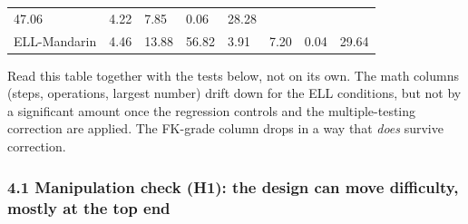 \documentclass[
]{article}
\begin{document}
\begin{longtable}[]{@{}llllllll@{}}
\begin{minipage}[t]{0.10\columnwidth}
47.06\strut
\end{minipage} & \begin{minipage}[t]{0.10\columnwidth}\raggedright
4.22\strut
\end{minipage} & \begin{minipage}[t]{0.10\columnwidth}\raggedright
7.85\strut
\end{minipage} & \begin{minipage}[t]{0.10\columnwidth}\raggedright
0.06\strut
\end{minipage} & \begin{minipage}[t]{0.10\columnwidth}\raggedright
28.28\strut
\end{minipage}\tabularnewline
\begin{minipage}[t]{0.10\columnwidth}\raggedright
ELL-Mandarin\strut
\end{minipage} & \begin{minipage}[t]{0.10\columnwidth}\raggedright
4.46\strut
\end{minipage} & \begin{minipage}[t]{0.10\columnwidth}\raggedright
13.88\strut
\end{minipage} & \begin{minipage}[t]{0.10\columnwidth}\raggedright
56.82\strut
\end{minipage} & \begin{minipage}[t]{0.10\columnwidth}\raggedright
3.91\strut
\end{minipage} & \begin{minipage}[t]{0.10\columnwidth}\raggedright
7.20\strut
\end{minipage} & \begin{minipage}[t]{0.10\columnwidth}\raggedright
0.04\strut
\end{minipage} & \begin{minipage}[t]{0.10\columnwidth}\raggedright
29.64\strut
\end{minipage}\tabularnewline
\bottomrule
\end{longtable}

Read this table together with the tests below, not on its own. The math
columns (steps, operations, largest number) drift down for the ELL
conditions, but not by a significant amount once the regression controls
and the multiple-testing correction are applied. The FK-grade column
drops in a way that \emph{does} survive correction.

\hypertarget{manipulation-check-h1-the-design-can-move-difficulty-mostly-at-the-top-end}{%
\subsubsection{4.1 Manipulation check (H1): the design can move
difficulty, mostly at the top
end}\label{manipulation-check-h1-the-design-can-move-difficulty-mostly-at-the-top-end}}
\end{document}
